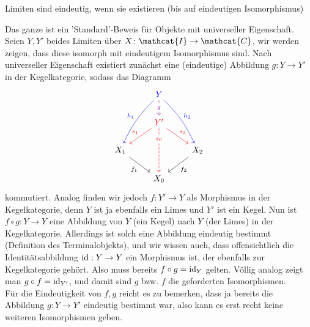 \begin{oral}
    Limiten sind eindeutig, wenn sie existieren (bis auf eindeutigen Isomorphismus)
\end{oral}
\begin{proof*}
    Das ganze ist ein 'Standard'-Beweis für Objekte mit universeller Eigenschaft. Seien $Y, Y'$ beides Limiten über  $X \colon  \mathcat{I} \to  \mathcat{C}$, wir werden zeigen, dass diese isomorph mit eindeutigem Isomorphismus sind. Nach universeller Eigenschaft existiert zunächst eine (eindeutige) Abbildung $g\colon  Y \to  Y'$ in der Kegelkategorie, sodass das Diagramm
    \[
    \begin{tikzcd}
        & {\color{blue}Y}\ar[bend right = 10, blue, swap]{ddl}{h_1} \ar[blue, bend left = 10]{ddr}{h_2} \ar[violet, dashed, "g" description]{d}  \\
        & {\color{red}Y'} \ar[red,swap]{dl}{s_1} \ar[red]{dr}{s_2} \ar[dashed, "s_0" description, near start, red]{dd}\\
        X_1 \ar[swap]{dr}{f_1} & & X_2\ar{dl}{f_2} \\
         & X_0
    \end{tikzcd}
\]
kommutiert. Analog finden wir jedoch $f\colon  Y' \to  Y$ als Morphismus in der Kegelkategorie, denn $Y$ ist ja ebenfalls ein Limes und  $Y'$ ist ein Kegel. Nun ist  $f \circ  g \colon  Y \to  Y$ eine Abbildung von $Y$ (ein Kegel) nach  $Y$ (der Limes) in der Kegelkategorie. Allerdings ist solch eine Abbildung eindeutig bestimmt (Definition des Terminalobjekts), und wir wissen auch, dass offensichtlich die Identitätsabbildung  $\operatorname{id} : Y \to  Y$ ein Morphismus ist, der ebenfalls zur Kegelkategorie gehört. Also muss bereits $f \circ  g = \operatorname{id}_Y$ gelten. Völlig analog zeigt man $g \circ  f = \operatorname{id}_{Y'}$, und damit sind $g$ bzw.  $f$ die geforderten Isomorphismen. \\
Für die Eindeutigkeit von  $f,g$ reicht es zu bemerken, dass ja bereits die Abbildung $g\colon Y\to Y'$ eindeutig bestimmt war, also kann es erst recht keine weiteren Isomorphismen geben.
\end{proof*}


